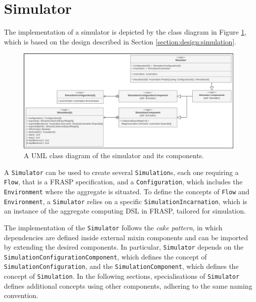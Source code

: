 
\section{Simulator}
\label{section:implementation:simulator}

The implementation of a simulator is depicted by the class diagram in Figure
\ref{figure:simulator-class-diagram}, which is based on the design described in
Section \ref{section:design:simulation}.

\begin{figure}[!ht]
  \centering
  \includegraphics[width=1\textwidth]{resources/figures/simulator-class-diagram.png}
  \caption{A UML class diagram of the simulator and its components.}
  \label{figure:simulator-class-diagram}
\end{figure}

A \texttt{Simulator} can be used to create several \texttt{Simulation}s, each
one requiring a \texttt{Flow}, that is a FRASP specification, and a
\texttt{Configuration}, which includes the \texttt{Environment} where the
aggregate is situated. To define the concepts of \texttt{Flow} and
\texttt{Environment}, a \texttt{Simulator} relies on a specific
\texttt{SimulationIncarnation}, which is an instance of the aggregate computing
\ac{DSL} in FRASP, tailored for simulation.

The implementation of the \texttt{Simulator} follows the \textit{cake pattern},
in which dependencies are defined inside external mixin components and can be
imported by extending the desired components. In particular, \texttt{Simulator}
depends on the \texttt{Simula\-tionConfigurationComponent}, which defines the
concept of \texttt{SimulationConfi\-guration}, and the
\texttt{SimulationCompo\-nent}, which defines the concept of
\texttt{Simula\-tion}. In the following sections, specialisations of
\texttt{Simulator} defines additional concepts using other components, adhering
to the same naming convention.

